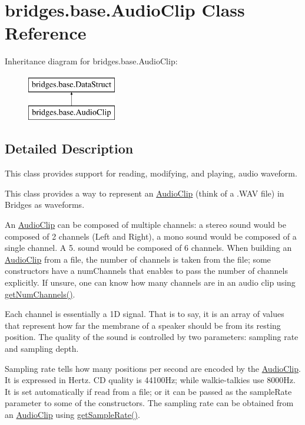 \hypertarget{classbridges_1_1base_1_1_audio_clip}{}\section{bridges.\+base.\+Audio\+Clip Class Reference}
\label{classbridges_1_1base_1_1_audio_clip}
Inheritance diagram for bridges.\+base.\+Audio\+Clip\+:\begin{figure}[H]
\begin{center}
\leavevmode
\includegraphics[height=2.000000cm]{classbridges_1_1base_1_1_audio_clip}
\end{center}
\end{figure}


\subsection{Detailed Description}
This class provides support for reading, modifying, and playing, audio waveform. 

This class provides a way to represent an \hyperlink{classbridges_1_1base_1_1_audio_clip}{Audio\+Clip} (think of a .W\+AV file) in Bridges as waveforms.

An \hyperlink{classbridges_1_1base_1_1_audio_clip}{Audio\+Clip} can be composed of multiple channels\+: a stereo sound would be composed of 2 channels (Left and Right), a mono sound would be composed of a single channel. A 5. sound would be composed of 6 channels. When building an \hyperlink{classbridges_1_1base_1_1_audio_clip}{Audio\+Clip} from a file, the number of channels is taken from the file; some constructors have a num\+Channels that enables to pass the number of channels explicitly. If unsure, one can know how many channels are in an audio clip using \hyperlink{classbridges_1_1base_1_1_audio_clip_a09e8b5da5249851f7583e910f24b0395}{get\+Num\+Channels()}.

Each channel is essentially a 1D signal. That is to say, it is an array of values that represent how far the membrane of a speaker should be from its resting position. The quality of the sound is controlled by two parameters\+: sampling rate and sampling depth.

Sampling rate tells how many positions per second are encoded by the \hyperlink{classbridges_1_1base_1_1_audio_clip}{Audio\+Clip}. It is expressed in Hertz. CD quality is 44100\+Hz; while walkie-\/talkies use 8000\+Hz. It is set automatically if read from a file; or it can be passed as the sample\+Rate parameter to some of the constructors. The sampling rate can be obtained from an \hyperlink{classbridges_1_1base_1_1_audio_clip}{Audio\+Clip} using \hyperlink{classbridges_1_1base_1_1_audio_clip_a610df43929946a6186e6739e361916eb}{get\+Sample\+Rate()}.

